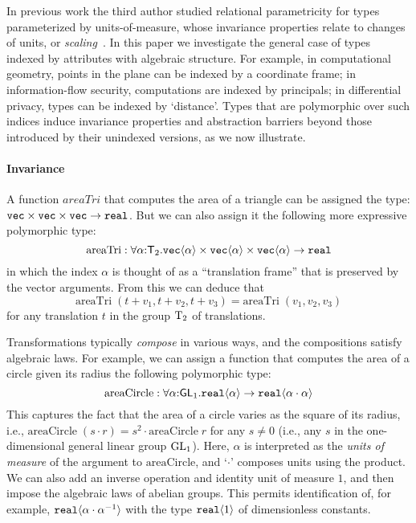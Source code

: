In previous work the third author studied relational parametricity for
types parameterized by units-of-measure, whose invariance 
properties relate to changes of units, or \emph{scaling}~\cite{kennedy97relational}. 
In this paper we investigate the general case of types indexed by attributes
with algebraic structure. For example, in computational geometry, points in
the plane can be indexed by a coordinate frame; in information-flow
security, computations are indexed by principals; in differential privacy, types
can be indexed by `distance'. Types that are
polymorphic over such indices induce invariance properties and
abstraction barriers beyond those introduced by their unindexed
versions, as we now illustrate.

\paragraph{Invariance}
A function $\mathit{areaTri}$ that computes the area of a triangle
can be assigned the type:
$\textup{\texttt{vec}}\times\textup{\texttt{vec}}\times\textup{\texttt{vec}}\to\texttt{real}$.
But we can also assign it the following more expressive polymorphic
type:
\[
\mathrm{areaTri} : \forall\alpha\mathord:\mathsf{T}_2.
  \textup{\texttt{vec}}\langle \alpha \rangle \times \textup{\texttt{vec}}\langle \alpha \rangle \times \textup{\texttt{vec}}\langle \alpha \rangle \to \texttt{real} \\
\]
in which the index $\alpha$ is thought of as a ``translation frame''
that is preserved by the vector arguments. From this we can deduce
that
\[
\mathrm{areaTri}\;(t + v_1, t + v_2, t + v_3) = 
\mathrm{areaTri}\;(v_1, v_2, v_3)
\]
for any translation $t$ in the group $\mathrm{T}_2$ of translations.

Transformations typically \emph{compose} in various
ways, and the compositions satisfy algebraic laws. For example, 
we can assign a function that computes the area of a circle given its
radius the following polymorphic type:
\[
\mathrm{areaCircle} : \forall\alpha\mathord:\mathsf{GL}_1.\textup{\texttt{real}}\langle \alpha \rangle\to
\textup{\texttt{real}}\langle \alpha\cdot\alpha \rangle
\]
This captures the fact that the area of a circle varies as the square
of its radius, i.e., $\mathrm{areaCircle}\;(s\cdot r) = s^2\cdot
\mathrm{areaCircle}\;r$ for any $s\neq 0$ (i.e., any $s$ in the
one-dimensional general linear group $\mathrm{GL}_1$).  Here, $\alpha$ is
interpreted as the \emph{units of measure} of the argument to
$\mathrm{areaCircle}$, and `$\cdot$' composes units using the
product. We can also add an inverse operation and identity unit of
measure $1$, and then impose the algebraic laws of abelian
groups. This permits identification of, for example,
$\textup{\texttt{real}}\langle \alpha\cdot\alpha^{-1} \rangle$ with the type
$\textup{\texttt{real}}\langle 1 \rangle$ of dimensionless constants.


